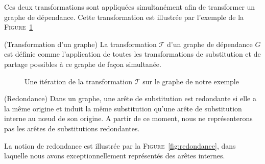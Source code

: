 Ces deux transformations sont appliquées simultanément afin de
transformer un graphe de dépendance. Cette transformation est illustrée
par l'exemple de la \textsc{Figure}~\ref{fig:etape_de_monomorphisation}

\begin{mydef} (Transformation d'un graphe)
La transformation $\mathcal{T}$ d'un graphe de dépendance $G$ est définie comme l'application de toutes les transformations de substitution et de partage possibles à ce graphe de façon simultanée.
\end{mydef}

\begin{figure}[h!]
\begin{center}
\end{center}
\caption{Une itération de la transformation $\mathcal{T}$ sur le graphe de notre exemple}
\label{fig:etape_de_monomorphisation}
\end{figure}


\begin{mydef} (Redondance)
Dans un graphe, une arête de substitution est redondante si elle a la m\^eme origine et induit la m\^eme substitution qu'une arête de substitution interne au nœud de son origine. A partir de ce moment, nous ne représenterons pas les arêtes de substitutions redondantes.
\end{mydef}

La notion de redondance est illustrée par la \textsc{Figure}~\ref{fig:redondance}, dans laquelle nous avons exceptionnellement représentés des arêtes internes.

